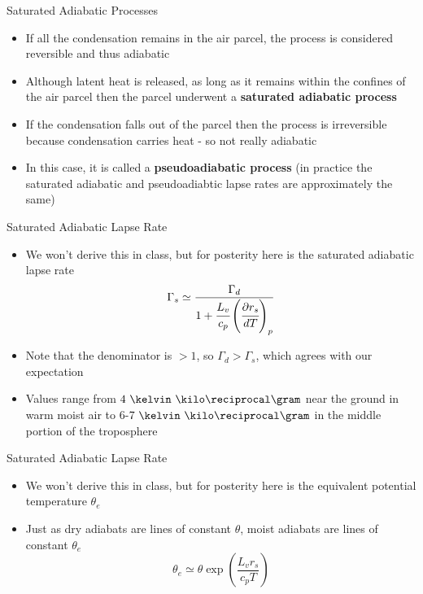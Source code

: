 \begin{frame}{Saturated Adiabatic Processes}
\begin{itemize}
	\item If all the condensation remains in the air parcel, the process is considered reversible and thus adiabatic
	\item Although latent heat is released, as long as it remains within the confines of the air parcel then the parcel underwent a \textbf{saturated adiabatic process}
	\item If the condensation falls out of the parcel then the process is irreversible because condensation carries heat - so not really adiabatic
	\item In this case, it is called a \textbf{pseudoadiabatic process} (in practice the saturated adiabatic and pseudoadiabtic lapse rates are approximately the same)
	\end{itemize}
\end{frame}
\begin{frame}{Saturated Adiabatic Lapse Rate}
\begin{itemize}
	\item We won't derive this in class, but for posterity here is the saturated adiabatic lapse rate
	$$\Gamma_s \simeq \frac{\Gamma_d}{1+\cfrac{L_v}{c_p}\left(\cfrac{\partial r_s}{dT}\right)_p}$$
	\item Note that the denominator is $>1$, so $\Gamma_d > \Gamma_s$, which agrees with our expectation
	\item Values range from $4\ \kelvin\ \kilo\reciprocal\gram$ near the ground in warm moist air to $6$-$7\ \kelvin\ \kilo\reciprocal\gram$ in the middle portion of the troposphere
\end{itemize}
\end{frame}
\begin{frame}{Saturated Adiabatic Lapse Rate}
\begin{itemize}
	\item We won't derive this in class, but for posterity here is the equivalent potential temperature $\theta_e$
	\item Just as dry adiabats are lines of constant $\theta$, moist adiabats are lines of constant $\theta_e$
	$$\theta_e \simeq \theta \exp\left(\frac{L_v r_s}{c_pT}\right)$$
\end{itemize}
\end{frame}

